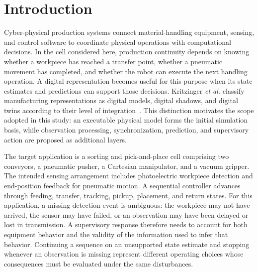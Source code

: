 \section{Introduction}
Cyber-physical production systems connect material-handling equipment, sensing, and control software to coordinate physical operations with computational decisions. In the cell considered here, production continuity depends on knowing whether a workpiece has reached a transfer point, whether a pneumatic movement has completed, and whether the robot can execute the next handling operation. A digital representation becomes useful for this purpose when its state estimates and predictions can support those decisions. Kritzinger \emph{et al.} classify manufacturing representations as digital models, digital shadows, and digital twins according to their level of integration~\cite{Kritzinger2018}. This distinction motivates the scope adopted in this study: an executable physical model forms the initial simulation basis, while observation processing, synchronization, prediction, and supervisory action are proposed as additional layers.

The target application is a sorting and pick-and-place cell comprising two conveyors, a pneumatic pusher, a Cartesian manipulator, and a vacuum gripper. The intended sensing arrangement includes photoelectric workpiece detection and end-position feedback for pneumatic motion. A sequential controller advances through feeding, transfer, tracking, pickup, placement, and return states. For this application, a missing detection event is ambiguous: the workpiece may not have arrived, the sensor may have failed, or an observation may have been delayed or lost in transmission. A supervisory response therefore needs to account for both equipment behavior and the validity of the information used to infer that behavior. Continuing a sequence on an unsupported state estimate and stopping whenever an observation is missing represent different operating choices whose consequences must be evaluated under the same disturbances.

